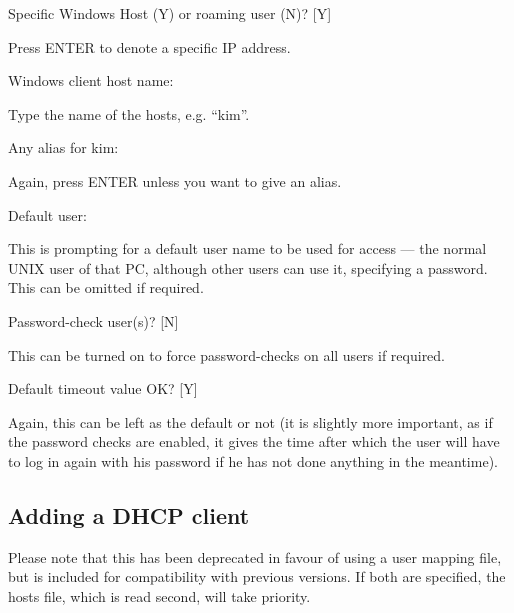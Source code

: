 \begin{expara}

Specific Windows Host (Y) or {\textasciigrave}roaming
user{\textquotesingle} (N)? [Y]

\end{expara}

Press ENTER to denote a specific IP address.

\begin{expara}

Windows client host name:

\end{expara}

Type the name of the hosts, e.g. ``kim''.

\begin{expara}

Any alias for kim:

\end{expara}

Again, press ENTER unless you want to give an alias.

\begin{expara}

Default user:

\end{expara}

This is prompting for a default user name to be used for access --- the
normal UNIX user of that PC, although other users can use it,
specifying a password. This can be omitted if required.

\begin{expara}

Password-check user(s)? [N]

\end{expara}

This can be turned on to force password-checks on all users if required.

\begin{expara}

Default timeout value OK? [Y]

\end{expara}

Again, this can be left as the default or not (it is slightly more
important, as if the password checks are enabled, it gives the time
after which the user will have to log in again with his password if he
has not done anything in the meantime).

\subsection{Adding a DHCP client}
Please note that this has been deprecated in favour of using a user
mapping file, but is included for compatibility with previous versions.
If both are specified, the hosts file, which is read second, will take
priority.

